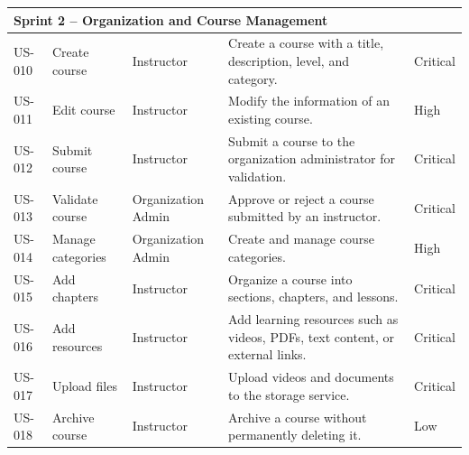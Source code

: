 \begin{longtable}{|p{1.3cm}|p{3cm}|p{2.4cm}|p{7.2cm}|p{1.7cm}|}
  \multicolumn{5}{|l|}{\cellcolor{gray!15}\textbf{Sprint 2 -- Organization and Course Management}} \\
  \hline
  US-010 & Create course & Instructor & Create a course with a title, description, level, and category. & Critical \\
  \hline
  US-011 & Edit course & Instructor & Modify the information of an existing course. & High \\
  \hline
  US-012 & Submit course & Instructor & Submit a course to the organization administrator for validation. & Critical \\
  \hline
  US-013 & Validate course & Organization Admin & Approve or reject a course submitted by an instructor. & Critical \\
  \hline
  US-014 & Manage categories & Organization Admin & Create and manage course categories. & High \\
  \hline
  US-015 & Add chapters & Instructor & Organize a course into sections, chapters, and lessons. & Critical \\
  \hline
  US-016 & Add resources & Instructor & Add learning resources such as videos, PDFs, text content, or external links. & Critical \\
  \hline
  US-017 & Upload files & Instructor & Upload videos and documents to the storage service. & Critical \\
  \hline
  US-018 & Archive course & Instructor & Archive a course without permanently deleting it. & Low \\
  \hline


\end{longtable}
